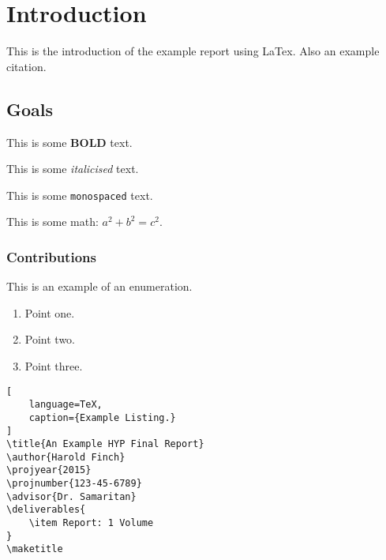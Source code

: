 \chapter{Introduction}
This is the introduction of the example report using LaTex\cite{lamport1986document}. Also an example citation.

\section{Goals}
This is some \textbf{BOLD} text.

This is some \textit{italicised} text.

This is some \texttt{monospaced} text.

This is some math: $a^2 + b^2 = c^2$.

\subsection{Contributions}
This is an example of an enumeration.

\begin{enumerate}
    \item Point one.
    \item Point two.
    \item Point three.
\end{enumerate}

\begin{lstlisting}[
    language=TeX,
    caption={Example Listing.}
]
\title{An Example HYP Final Report}
\author{Harold Finch}
\projyear{2015}
\projnumber{123-45-6789}
\advisor{Dr. Samaritan}
\deliverables{
    \item Report: 1 Volume
}
\maketitle
\end{lstlisting}